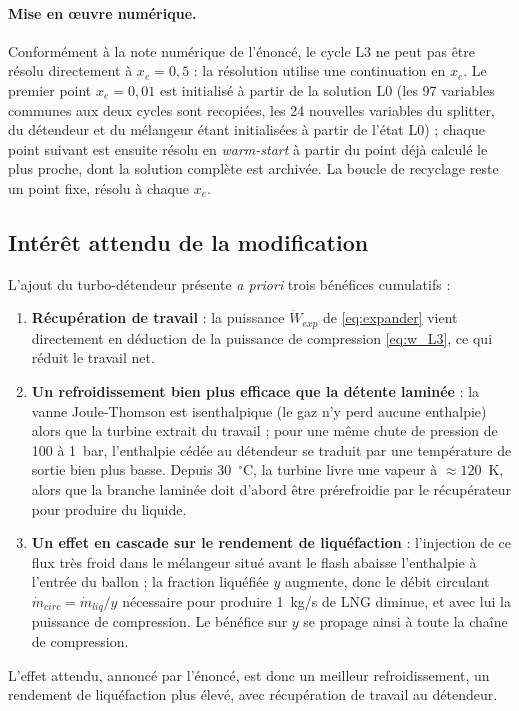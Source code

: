 \paragraph{Mise en \oe uvre numérique.}
Conformément à la note numérique de l'énoncé, le cycle L3 ne peut pas être
résolu directement à $x_e = 0{,}5$ : la résolution utilise une continuation
en $x_e$. Le premier point $x_e = 0{,}01$ est initialisé à partir de la
solution L0 (les 97 variables communes aux deux cycles sont recopiées, les
24 nouvelles variables du splitter, du détendeur et du mélangeur étant
initialisées à partir de l'état L0) ; chaque point suivant est ensuite
résolu en \emph{warm-start} à partir du point déjà calculé le plus proche,
dont la solution complète est archivée. La boucle de recyclage reste un
point fixe, résolu à chaque $x_e$.

\subsection{Intérêt attendu de la modification}

L'ajout du turbo-détendeur présente \emph{a priori} trois bénéfices
cumulatifs :
\begin{enumerate}
  \item \textbf{Récupération de travail} : la puissance
        $\dot W_{exp}$ de \eqref{eq:expander} vient directement en
        déduction de la puissance de compression
        \eqref{eq:w_L3}, ce qui réduit le travail net.
  \item \textbf{Un refroidissement bien plus efficace que la détente
        laminée} : la vanne Joule-Thomson est isenthalpique (le gaz n'y perd
        aucune enthalpie) alors que la turbine extrait du travail ; pour une
        même chute de pression de 100 à 1~bar, l'enthalpie cédée au
        détendeur se traduit par une température de sortie
        bien plus basse. Depuis 30~$^\circ$C, la turbine livre une vapeur à
        $\approx 120$~K, alors que la branche laminée doit d'abord être
        prérefroidie par le récupérateur pour produire du liquide.
  \item \textbf{Un effet en cascade sur le rendement de liquéfaction} :
        l'injection de ce flux très froid dans le mélangeur situé avant le
        flash abaisse l'enthalpie à l'entrée du ballon ; la fraction
        liquéfiée $y$ augmente, donc le débit circulant
        $\dot m_{circ} = \dot m_{liq}/y$ nécessaire pour produire 1~kg/s de
        LNG diminue, et avec lui la puissance de compression. Le bénéfice
        sur $y$ se propage ainsi à toute la chaîne de compression.
\end{enumerate}
L'effet attendu, annoncé par l'énoncé, est donc un meilleur refroidissement,
un rendement de liquéfaction plus élevé, avec récupération de travail au
détendeur.


